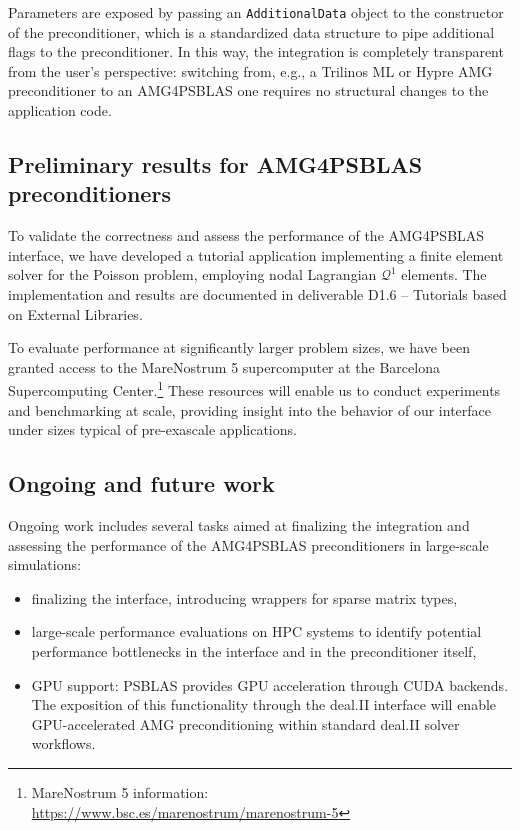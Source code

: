 \documentclass[a4paper,12pt]{article}
\begin{document}
Parameters are exposed by passing an \texttt{AdditionalData} object to the constructor of the preconditioner, which is a
standardized data structure to pipe additional flags to the preconditioner. In this way, the integration is completely
transparent from the user's perspective: switching from, e.g., a Trilinos ML or Hypre AMG preconditioner to an AMG4PSBLAS one requires
no structural changes to the application code.

\subsection{Preliminary results for AMG4PSBLAS preconditioners}

To validate the correctness and assess the performance of the AMG4PSBLAS interface, we have developed a tutorial application implementing a finite element solver for the Poisson problem, employing
nodal Lagrangian $\mathcal{Q}^1$ elements. The implementation and results are documented in deliverable D1.6 -- Tutorials based on External Libraries.

To evaluate performance at significantly larger problem sizes, we have been granted access to the MareNostrum 5 supercomputer at the Barcelona Supercomputing Center.\footnote{MareNostrum 5 information: \url{https://www.bsc.es/marenostrum/marenostrum-5}} These resources will enable us to conduct experiments and benchmarking at scale, providing insight into the behavior of our interface under sizes
typical of pre-exascale applications.

\subsection{Ongoing and future work}

Ongoing work includes several tasks aimed at finalizing the integration and assessing the performance of the AMG4PSBLAS preconditioners in large-scale simulations:
\begin{itemize}
    \item finalizing the interface, introducing wrappers for sparse matrix types,
    \item large-scale performance evaluations on HPC systems to identify potential performance bottlenecks in the interface and in the preconditioner itself,
    \item GPU support: PSBLAS provides GPU acceleration through CUDA backends. The exposition of this functionality through the
          deal.II interface will enable GPU-accelerated AMG preconditioning within standard deal.II solver workflows.
\end{itemize}
\end{document}
